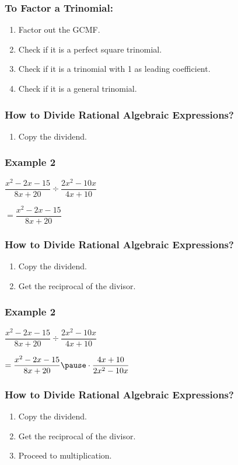 \documentclass[14pt]{beamer}
\begin{document}
   \begin{frame}
   	\frametitle{To Factor a Trinomial:}
   	\begin{enumerate}
   		\item<1-> Factor out the GCMF.
   		\item<2-> Check if it is a perfect square trinomial.
   		\item<3-> Check if it is a trinomial with 1 as leading coefficient.
   		\item<4-> Check if it is a general trinomial.
   	\end{enumerate}
   \end{frame}

     \begin{frame}
    	\frametitle{How to Divide Rational Algebraic Expressions?}
    	\begin{enumerate}
    		\item Copy the dividend.
    	\end{enumerate}
    \end{frame}

    \begin{frame}
    	\frametitle{Example 2}
    	$\dfrac{x^2 - 2x - 15}{8x + 20} \div \dfrac{2x^2 - 10x}{4x + 10}$ 
    	
    	\pause \vspace{1em} $ =  \dfrac{x^2 - 2x - 15}{8x + 20} $
    \end{frame}

 \begin{frame}
	\frametitle{How to Divide Rational Algebraic Expressions?}
	\begin{enumerate}
		\item Copy the dividend.
		\item Get the reciprocal of the divisor.
	\end{enumerate}
\end{frame}

    \begin{frame}
    	\frametitle{Example 2}
    	$\dfrac{x^2 - 2x - 15}{8x + 20} \div \dfrac{2x^2 - 10x}{4x + 10}$ 
    	
    	\vspace{1em}$ =  \dfrac{x^2 - 2x - 15}{8x + 20} \pause \cdot \dfrac{4x + 10}{2x^2 - 10x}$
    \end{frame}

     \begin{frame}
    	\frametitle{How to Divide Rational Algebraic Expressions?}
    	\begin{enumerate}
    		\item Copy the dividend.
    		\item Get the reciprocal of the divisor.
    		\item Proceed to multiplication.
    	\end{enumerate}
    \end{frame}
\end{document}
